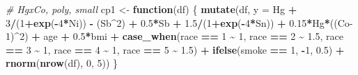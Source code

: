 \documentclass[12pt, twoside]{amherstthesis}
\newenvironment{Shaded}{\begin{snugshade}}{\end{snugshade}}
\newcommand{\AttributeTok}[1]{\textcolor[rgb]{0.13,0.29,0.53}{#1}}
\newcommand{\CommentTok}[1]{\textcolor[rgb]{0.56,0.35,0.01}{\textit{#1}}}
\newcommand{\ControlFlowTok}[1]{\textcolor[rgb]{0.13,0.29,0.53}{\textbf{#1}}}
\newcommand{\DecValTok}[1]{\textcolor[rgb]{0.00,0.00,0.81}{#1}}
\newcommand{\FloatTok}[1]{\textcolor[rgb]{0.00,0.00,0.81}{#1}}
\newcommand{\FunctionTok}[1]{\textcolor[rgb]{0.13,0.29,0.53}{\textbf{#1}}}
\newcommand{\NormalTok}[1]{#1}
\newcommand{\OtherTok}[1]{\textcolor[rgb]{0.56,0.35,0.01}{#1}}
\newcommand{\SpecialCharTok}[1]{\textcolor[rgb]{0.81,0.36,0.00}{\textbf{#1}}}
\begin{document}
\begin{Shaded}
\begin{Highlighting}[]
\CommentTok{\# HgxCo, poly, small}
\NormalTok{cp1 }\OtherTok{\textless{}{-}} \ControlFlowTok{function}\NormalTok{(df) \{}
  \FunctionTok{mutate}\NormalTok{(df, }\AttributeTok{y =} 
\NormalTok{           Hg }\SpecialCharTok{+} \DecValTok{3}\SpecialCharTok{/}\NormalTok{(}\DecValTok{1}\SpecialCharTok{+}\FunctionTok{exp}\NormalTok{(}\SpecialCharTok{{-}}\DecValTok{4}\SpecialCharTok{*}\NormalTok{Ni)) }\SpecialCharTok{{-}}\NormalTok{ (Sb}\SpecialCharTok{\^{}}\DecValTok{2}\NormalTok{) }\SpecialCharTok{+} \FloatTok{0.5}\SpecialCharTok{*}\NormalTok{Sb }\SpecialCharTok{+} \FloatTok{1.5}\SpecialCharTok{/}\NormalTok{(}\DecValTok{1}\SpecialCharTok{+}\FunctionTok{exp}\NormalTok{(}\SpecialCharTok{{-}}\DecValTok{4}\SpecialCharTok{*}\NormalTok{Sn)) }\SpecialCharTok{+} 
           \FloatTok{0.15}\SpecialCharTok{*}\NormalTok{Hg}\SpecialCharTok{*}\NormalTok{((Co}\DecValTok{{-}1}\NormalTok{)}\SpecialCharTok{\^{}}\DecValTok{2}\NormalTok{) }\SpecialCharTok{+}
\NormalTok{           age }\SpecialCharTok{+} \FloatTok{0.5}\SpecialCharTok{*}\NormalTok{bmi }\SpecialCharTok{+} 
           \FunctionTok{case\_when}\NormalTok{(race }\SpecialCharTok{==} \DecValTok{1} \SpecialCharTok{\textasciitilde{}} \DecValTok{1}\NormalTok{, }
\NormalTok{                     race }\SpecialCharTok{==} \DecValTok{2} \SpecialCharTok{\textasciitilde{}} \FloatTok{1.5}\NormalTok{, }
\NormalTok{                     race }\SpecialCharTok{==} \DecValTok{3} \SpecialCharTok{\textasciitilde{}} \DecValTok{1}\NormalTok{, }
\NormalTok{                     race }\SpecialCharTok{==} \DecValTok{4} \SpecialCharTok{\textasciitilde{}} \DecValTok{1}\NormalTok{, }
\NormalTok{                     race }\SpecialCharTok{==} \DecValTok{5} \SpecialCharTok{\textasciitilde{}} \FloatTok{1.5}\NormalTok{) }\SpecialCharTok{+}
           \FunctionTok{ifelse}\NormalTok{(smoke }\SpecialCharTok{==} \DecValTok{1}\NormalTok{, }\SpecialCharTok{{-}}\DecValTok{1}\NormalTok{, }\FloatTok{0.5}\NormalTok{) }\SpecialCharTok{+}
           \FunctionTok{rnorm}\NormalTok{(}\FunctionTok{nrow}\NormalTok{(df), }\DecValTok{0}\NormalTok{, }\DecValTok{5}\NormalTok{))}
\NormalTok{\}}


\end{Highlighting}
\end{Shaded}
\end{document}
